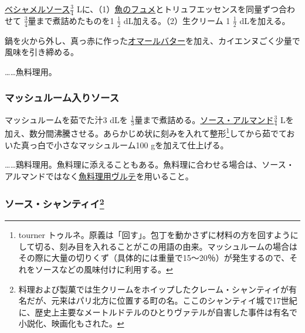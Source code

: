 \begin{recette}
\protect\hyperlink{sauce-bechamel}{ベシャメルソース}\(\frac{3}{4}\)
Lに、（1）\protect\hyperlink{fumet-de-poisson}{魚のフュメ}とトリュフエッセンスを同量ずつ合わせて
\(\frac{3}{4}\)量まで煮詰めたものを1 \(\frac{1}{2}\)
dL加える。（2）生クリーム 1 \(\frac{1}{2}\) dLを加える。

鍋を火から外し、真っ赤に作った\protect\hyperlink{beurre-de-homard}{オマールバター}を加え、カイエンヌごく少量で風味を引き締める。

\ldots{}\ldots{}魚料理用。

\hypertarget{sauce-aux-champignons-blanche}{%
\subsubsection{マッシュルーム入りソース}\label{sauce-aux-champignons-blanche}}



マッシュルームを茹でた汁3 dLを
\(\frac{1}{3}\)量まで煮詰める。\protect\hyperlink{sauce-allemande}{ソース・アルマンド}\(\frac{3}{4}\)
Lを加え、数分間沸騰させる。あらかじめ状に刻みを入れて整形\footnote{tourner
  トゥルネ。原義は「回す」。包丁を動かさずに材料の方を回すようにして切る、刻み目を入れることがこの用語の由来。マッシュルームの場合はその際に大量の切りくず（具体的には重量で15〜20％）が発生するので、それをソースなどの風味付けに利用する。}してから茹でておいた真っ白で小さなマッシュルーム100
gを加えて仕上げる。

\ldots{}\ldots{}鶏料理用。魚料理に添えることもある。魚料理に合わせる場合は、ソース・アルマンドではなく\protect\hyperlink{veloute-de-poisson}{魚料理用ヴルテ}を用いること。

\hypertarget{sauce-chantilly}{%
\subsubsection[ソース・シャンティイ]{\texorpdfstring{ソース・シャンティイ\footnote{料理および製菓では生クリームをホイップしたクレーム・シャンティイが有名だが、元来はパリ北方に位置する町の名。ここのシャンティイ城で17世紀に、歴史上主要なメートルドテルのひとりヴァテルが自害した事件は有名で小説化、映画化もされた。}}{ソース・シャンティイ}}\label{sauce-chantilly}}


\end{recette}
